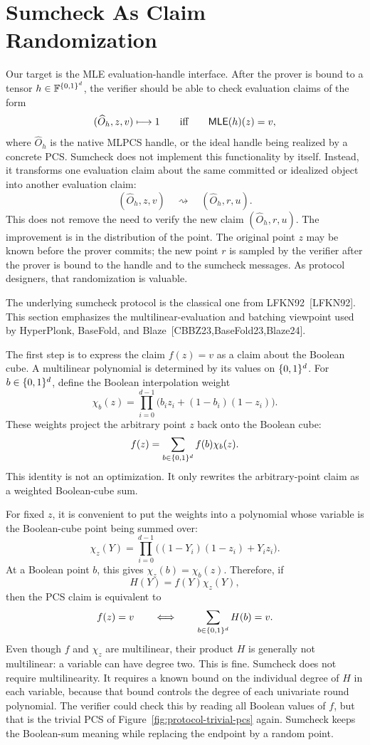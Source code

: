 \section{Sumcheck As Claim Randomization}

Our target is the MLE evaluation-handle interface.  After the prover is bound
to a tensor \(h\in\mathbb{F}^{\{0,1\}^d}\), the verifier should be able to check evaluation
claims of the form
\[
  (\widehat O_h,z,v)\longmapsto 1
  \qquad\text{iff}\qquad
  \mathsf{MLE}(h)(z)=v,
\]
where \(\widehat O_h\) is the native MLPCS handle, or the ideal handle being
realized by a concrete PCS.  Sumcheck does not implement this functionality by
itself.  Instead, it transforms one evaluation claim about the same committed
or idealized object into another evaluation claim:
\[
  (\widehat O_h,z,v)\quad\rightsquigarrow\quad(\widehat O_h,r,u).
\]
This does not remove the need to verify the new claim
\((\widehat O_h,r,u)\).  The improvement is in the distribution of the point.
The original point \(z\) may be known before the prover commits; the new point
\(r\) is sampled by the verifier after the prover is bound to the handle and to
the sumcheck messages.  As protocol designers, that randomization is valuable.

The underlying sumcheck protocol is the classical one from LFKN92~[LFKN92].
This section emphasizes the multilinear-evaluation and batching viewpoint used
by HyperPlonk, BaseFold, and Blaze~[CBBZ23,BaseFold23,Blaze24].

The first step is to express the claim $f(z)=v$ as a claim about the Boolean
cube.  A multilinear polynomial is determined by its values on $\{0,1\}^d$.  For
$b\in\{0,1\}^d$, define the Boolean interpolation weight
\[
  \chi_b(z)
  =
  \prod_{i=0}^{d-1}\bigl(b_i z_i+(1-b_i)(1-z_i)\bigr).
\]
These weights project the arbitrary point $z$ back onto the Boolean cube:
\[
  f(z)
  =
  \sum_{b\in\{0,1\}^d} f(b)\chi_b(z).
\]
This identity is not an optimization.  It only rewrites the arbitrary-point
claim as a weighted Boolean-cube sum.

For fixed $z$, it is convenient to put the weights into a polynomial whose
variable is the Boolean-cube point being summed over:
\[
  \chi_z(Y)
  =
  \prod_{i=0}^{d-1}\bigl((1-Y_i)(1-z_i)+Y_i z_i\bigr).
\]
At a Boolean point $b$, this gives $\chi_z(b)=\chi_b(z)$.  Therefore, if
\[
  H(Y)=f(Y)\chi_z(Y),
\]
then the PCS claim is equivalent to
\[
  f(z)=v
  \qquad\Longleftrightarrow\qquad
  \sum_{b\in\{0,1\}^d}H(b)=v.
\]
Even though $f$ and $\chi_z$ are multilinear, their product $H$ is generally
not multilinear: a variable can have degree two.  This is fine.  Sumcheck does
not require multilinearity.  It requires a known bound on the individual degree
of $H$ in each variable, because that bound controls the degree of each
univariate round polynomial.
The verifier could check this by reading all Boolean values of $f$, but that is
the trivial PCS of Figure~\ref{fig:protocol-trivial-pcs} again.  Sumcheck keeps
the Boolean-sum meaning while replacing the endpoint by a random point.

